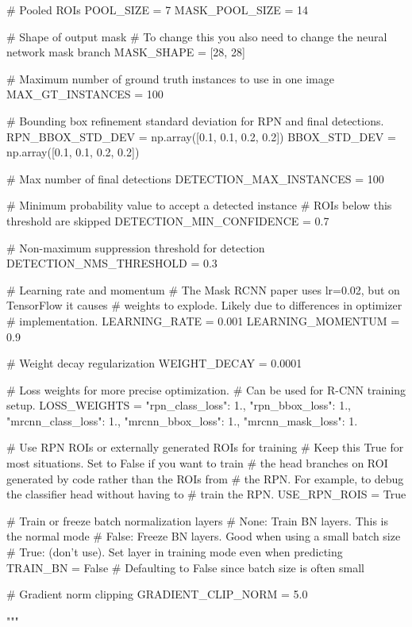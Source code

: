     # Pooled ROIs
    POOL_SIZE = 7
    MASK_POOL_SIZE = 14

    # Shape of output mask
    # To change this you also need to change the neural network mask branch
    MASK_SHAPE = [28, 28]

    # Maximum number of ground truth instances to use in one image
    MAX_GT_INSTANCES = 100

    # Bounding box refinement standard deviation for RPN and final detections.
    RPN_BBOX_STD_DEV = np.array([0.1, 0.1, 0.2, 0.2])
    BBOX_STD_DEV = np.array([0.1, 0.1, 0.2, 0.2])

    # Max number of final detections
    DETECTION_MAX_INSTANCES = 100

    # Minimum probability value to accept a detected instance
    # ROIs below this threshold are skipped
    DETECTION_MIN_CONFIDENCE = 0.7

    # Non-maximum suppression threshold for detection
    DETECTION_NMS_THRESHOLD = 0.3

    # Learning rate and momentum
    # The Mask RCNN paper uses lr=0.02, but on TensorFlow it causes
    # weights to explode. Likely due to differences in optimizer
    # implementation.
    LEARNING_RATE = 0.001
    LEARNING_MOMENTUM = 0.9

    # Weight decay regularization
    WEIGHT_DECAY = 0.0001

    # Loss weights for more precise optimization.
    # Can be used for R-CNN training setup.
    LOSS_WEIGHTS = {
        "rpn_class_loss": 1.,
        "rpn_bbox_loss": 1.,
        "mrcnn_class_loss": 1.,
        "mrcnn_bbox_loss": 1.,
        "mrcnn_mask_loss": 1.
    }

    # Use RPN ROIs or externally generated ROIs for training
    # Keep this True for most situations. Set to False if you want to train
    # the head branches on ROI generated by code rather than the ROIs from
    # the RPN. For example, to debug the classifier head without having to
    # train the RPN.
    USE_RPN_ROIS = True

    # Train or freeze batch normalization layers
    #     None: Train BN layers. This is the normal mode
    #     False: Freeze BN layers. Good when using a small batch size
    #     True: (don't use). Set layer in training mode even when predicting
    TRAIN_BN = False  # Defaulting to False since batch size is often small

    # Gradient norm clipping
    GRADIENT_CLIP_NORM = 5.0
    
""" 
    
